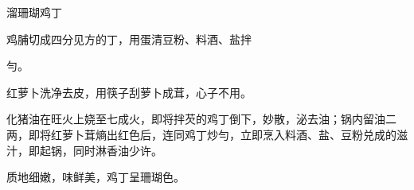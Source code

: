 \begin{recipe}{溜珊瑚鸡丁}

\ingredients


\cooking

\step 鸡脯切成四分见方的丁，用蛋清豆粉、料酒、盐拌

勻。

\step 红萝卜洗净去皮，用筷子刮萝卜成茸，心子不用。

\step 化猪油在旺火上娆至七成火，即将拌芡的鸡丁倒下，妙散，泌去油；锅内留油二两，即将红萝卜茸熵出红色后，连同鸡丁炒勻，立即烹入料酒、盐、豆粉兑成的滋汁，即起锅，同时淋香油少许。

\notes

质地细嫩，味鲜美，鸡丁呈珊瑚色。

\end{recipe}

